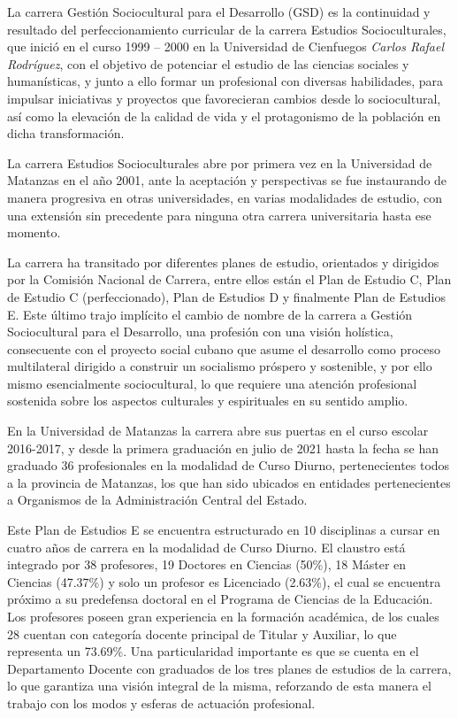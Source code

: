 La carrera Gestión Sociocultural para el Desarrollo (GSD) es la continuidad y resultado del perfeccionamiento curricular de la carrera Estudios Socioculturales, que inició en el curso 1999 – 2000 en la Universidad de Cienfuegos \emph{Carlos Rafael Rodríguez}, con el objetivo de potenciar el estudio de las ciencias sociales y humanísticas, y junto a ello formar un profesional con diversas habilidades, para impulsar iniciativas y proyectos que favorecieran cambios desde lo sociocultural, así como la elevación de la calidad de vida y el protagonismo de la población en dicha transformación. 

La carrera Estudios Socioculturales abre por primera vez en la Universidad de Matanzas en el año 2001, ante la aceptación y perspectivas se fue instaurando de manera progresiva en otras universidades, en varias modalidades de estudio, con una extensión sin precedente para ninguna otra carrera universitaria hasta ese momento.

La carrera ha transitado por diferentes planes de estudio, orientados y dirigidos por la Comisión Nacional de Carrera, entre ellos están el Plan de Estudio C, Plan de Estudio C (perfeccionado), Plan de Estudios D y finalmente Plan de Estudios E. Este último trajo implícito el cambio de nombre de la carrera a Gestión Sociocultural para el Desarrollo, una profesión con una visión holística, consecuente con el proyecto social cubano que asume el desarrollo como proceso multilateral dirigido a construir un socialismo próspero y sostenible, y por ello mismo esencialmente sociocultural, lo que requiere una atención profesional sostenida sobre los aspectos culturales y espirituales en su sentido amplio. 

En la Universidad de Matanzas la carrera abre sus puertas en el curso escolar 2016-2017, y desde la primera graduación en julio de 2021 hasta la fecha se han graduado 36 profesionales en la modalidad de Curso Diurno, pertenecientes todos a la provincia de Matanzas, los que han sido ubicados en entidades pertenecientes a Organismos de la Administración Central del Estado. 

Este Plan de Estudios E se encuentra estructurado en 10 disciplinas a cursar en cuatro años de carrera en la modalidad de Curso Diurno. El claustro está integrado por 38 profesores, 19 Doctores en Ciencias (50\%), 18 Máster en Ciencias (47.37\%) y solo un profesor es Licenciado (2.63\%), el cual se encuentra próximo a su predefensa doctoral en el Programa de Ciencias de la Educación. Los profesores poseen gran experiencia en la formación académica, de los cuales 28 cuentan con categoría docente principal de Titular y Auxiliar, lo que representa un 73.69\%. Una particularidad importante es que se cuenta en el Departamento Docente con graduados de los tres planes de estudios de la carrera, lo que garantiza una visión integral de la misma, reforzando de esta manera el trabajo con los modos y esferas de actuación profesional.

